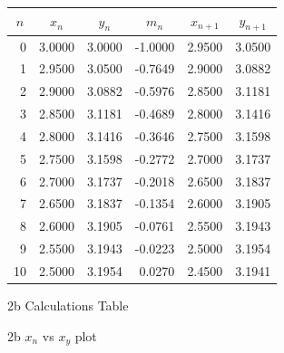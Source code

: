 \documentclass[answers,addpoints]{exam}
\begin{document}
\begin{questions}
\begin{solution}
    \begin{figure}[H]
      \centering
      \begin{tabular}{r r r r r r}
        \hline
        \multicolumn{1}{c}{$n$} &
        \multicolumn{1}{c}{$x_n$} &
        \multicolumn{1}{c}{$y_n$} &
        \multicolumn{1}{c}{$m_n$} &
        \multicolumn{1}{c}{$x_{n+1}$} &
        \multicolumn{1}{c}{$y_{n+1}$} \\
        \hline
        0 & 3.0000 & 3.0000 & -1.0000 & 2.9500 & 3.0500 \\
        1 & 2.9500 & 3.0500 & -0.7649 & 2.9000 & 3.0882 \\
        2 & 2.9000 & 3.0882 & -0.5976 & 2.8500 & 3.1181 \\
        3 & 2.8500 & 3.1181 & -0.4689 & 2.8000 & 3.1416 \\
        4 & 2.8000 & 3.1416 & -0.3646 & 2.7500 & 3.1598 \\
        5 & 2.7500 & 3.1598 & -0.2772 & 2.7000 & 3.1737 \\
        6 & 2.7000 & 3.1737 & -0.2018 & 2.6500 & 3.1837 \\
        7 & 2.6500 & 3.1837 & -0.1354 & 2.6000 & 3.1905 \\
        8 & 2.6000 & 3.1905 & -0.0761 & 2.5500 & 3.1943 \\
        9 & 2.5500 & 3.1943 & -0.0223 & 2.5000 & 3.1954 \\
        10 & 2.5000 & 3.1954 & 0.0270 & 2.4500 & 3.1941 \\
        \hline
      \end{tabular}
      \caption{2b Calculations Table}
      \label{fig:2b-table}
    \end{figure}

    \begin{figure}[H]
      \centering
      \caption{2b $x_n$ vs $x_y$ plot}
      \label{fig:2b-plot}
    \end{figure}


\end{solution}
\end{questions}
\end{document}
